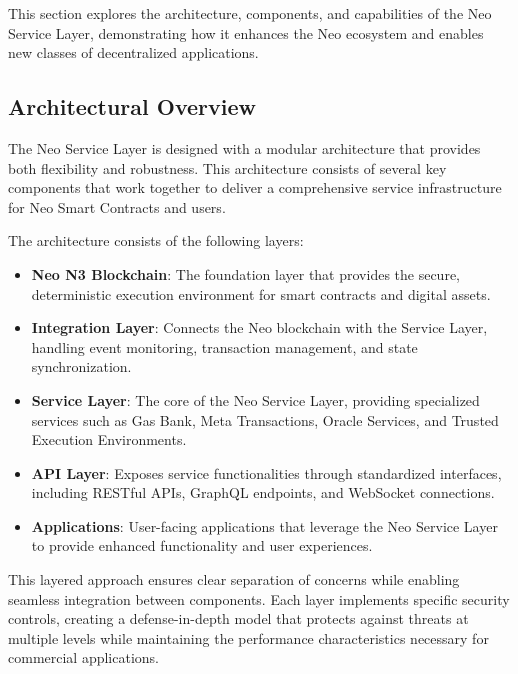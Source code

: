 This section explores the architecture, components, and capabilities of the Neo Service Layer, demonstrating how it enhances the Neo ecosystem and enables new classes of decentralized applications.

\subsection{Architectural Overview}
\label{subsec:nsl-architecture}

The Neo Service Layer is designed with a modular architecture that provides both flexibility and robustness. This architecture consists of several key components that work together to deliver a comprehensive service infrastructure for Neo Smart Contracts and users.



The architecture consists of the following layers:

\begin{itemize}
    \item \textbf{Neo N3 Blockchain}: The foundation layer that provides the secure, deterministic execution environment for smart contracts and digital assets.
    
    \item \textbf{Integration Layer}: Connects the Neo blockchain with the Service Layer, handling event monitoring, transaction management, and state synchronization.
    
    \item \textbf{Service Layer}: The core of the Neo Service Layer, providing specialized services such as Gas Bank, Meta Transactions, Oracle Services, and Trusted Execution Environments.
    
    \item \textbf{API Layer}: Exposes service functionalities through standardized interfaces, including RESTful APIs, GraphQL endpoints, and WebSocket connections.
    
    \item \textbf{Applications}: User-facing applications that leverage the Neo Service Layer to provide enhanced functionality and user experiences.
\end{itemize}

This layered approach ensures clear separation of concerns while enabling seamless integration between components. Each layer implements specific security controls, creating a defense-in-depth model that protects against threats at multiple levels while maintaining the performance characteristics necessary for commercial applications.

